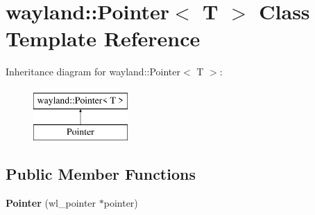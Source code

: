\hypertarget{classwayland_1_1Pointer}{}\section{wayland\+::Pointer$<$ T $>$ Class Template Reference}
\label{classwayland_1_1Pointer}
Inheritance diagram for wayland\+::Pointer$<$ T $>$\+:\begin{figure}[H]
\begin{center}
\leavevmode
\includegraphics[height=2.000000cm]{classwayland_1_1Pointer}
\end{center}
\end{figure}
\subsection*{Public Member Functions}
\begin{DoxyCompactItemize}
\item 
\mbox{\label{classwayland_1_1Pointer_a0131d01952e081c5c95fd0595980c8c5}} 
{\bfseries Pointer} (wl\+\_\+pointer $\ast$pointer)
\end{DoxyCompactItemize}
